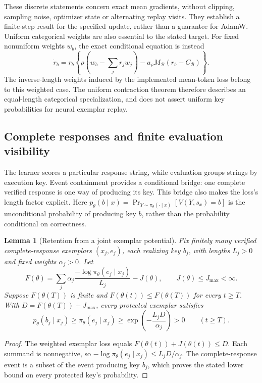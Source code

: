 \documentclass{article}
\newcommand{\enforcehalffinalproseline}{%
  \setlength{\parfillskip}{0pt plus .20\linewidth}}
\newcommand{\1}{\mathbf 1}
\newtheorem{lemma}{Lemma}[section]
\theoremstyle{remark}
\theoremstyle{definition}
\theoremstyle{plain}
\begin{document}
These discrete statements concern exact mean gradients, without clipping,
sampling noise, optimizer state or alternating replay visits. They establish
a finite-step result for the specified update, rather than a guarantee for
AdamW. Uniform categorical weights are also essential to the stated target.
For fixed nonuniform weights $w_b$, the exact conditional equation is instead
\begin{equation}
 \dot r_b=r_b\left\{
   \rho\left(w_b-\sum_jr_jw_j\right)
   -a_\rho M_{\mathcal B}(r_b-C_{\mathcal B})\right\}.
 \label{eq:replay-finite-weighted}
\end{equation}
The inverse-length weights induced by the implemented mean-token loss belong
to this weighted case. The uniform contraction theorem therefore describes
an equal-length categorical specialization, and does not assert uniform key
probabilities for neural exemplar replay.


\subsection{Complete responses and finite evaluation visibility}
\label{app:theory-exemplar-bridge}

The learner scores a particular response string, while evaluation groups
strings by execution key. Event containment provides a conditional bridge:
one complete verified response is one way of producing its key. This bridge
also makes the loss's length factor explicit. Here
$p_\theta(b\mid x)=\Pr_{Y\sim\pi_\theta(\cdot\mid x)}[V(Y,s_x)=b]$
is the unconditional probability of producing key $b$, rather than the
probability conditional on correctness.

\begin{lemma}[Retention from a joint exemplar potential]
\enforcehalffinalproseline
\label{lem:shared-exemplar-retention}
Fix finitely many verified complete-response exemplars $(x_j,e_j)$, each
realizing key $b_j$, with lengths $L_j>0$ and fixed weights $\alpha_j>0$.
Let
\[
 F(\theta)=\sum_j\alpha_j
 \frac{-\log\pi_\theta(e_j\mid x_j)}{L_j}-J(\theta),
 \qquad J(\theta)\le J_{\max}<\infty.
\]
Suppose $F(\theta(T))$ is finite and
$F(\theta(t))\le F(\theta(T))$ for every $t\ge T$. With
$D=F(\theta(T))+J_{\max}$, every protected exemplar satisfies
\[
 p_\theta(b_j\mid x_j)\ge\pi_\theta(e_j\mid x_j)
 \ge\exp\!\left(-\frac{L_jD}{\alpha_j}\right)>0
 \qquad(t\ge T).
\]
\end{lemma}
\begin{proof}
\enforcehalffinalproseline
The weighted exemplar loss equals $F(\theta(t))+J(\theta(t))\le D$.
Each summand is nonnegative, so
$-\log\pi_\theta(e_j\mid x_j)\le L_jD/\alpha_j$.
The complete-response event is a subset of the event producing key $b_j$,
which proves the stated lower bound on every protected key's probability.
\end{proof}
\end{document}
